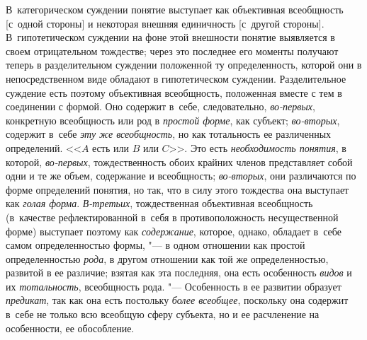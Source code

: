 В~категорическом суждении понятие выступает как объективная
всеобщность [с~одной стороны] и некоторая внешняя единичность [с~другой
стороны]. В~гипотетическом суждении на фоне этой внешности понятие
выявляется в своем отрицательном тождестве; через это последнее его моменты
получают теперь в разделительном суждении положенной ту определенность,
которой они в непосредственном виде обладают в гипотетическом суждении.
Разделительное суждение есть поэтому объективная всеобщность, положенная
вместе с тем в соединении с формой. Оно содержит в~себе, следовательно,
{\em во-первых}, конкретную всеобщность или род в {\em простой форме}, как
субъект; {\em во-вторых}, содержит в~себе {\em эту
же всеобщность}, но как тотальность ее
различенных определений. <<$A$ есть или $B$ или $C$>>. Это есть
{\em необходимость понятия}, в которой, {\em во-первых},
тождественность обоих крайних членов представляет собой одни
и те же объем, содержание и всеобщность;
{\em во-вторых}, они
различаются по форме определений понятия, но так, что в силу этого
тождества она выступает как {\em голая
форма}. {\em В-третьих},
тождественная объективная всеобщность (в~качестве
рефлектированной в~себя в противоположность несущественной форме) выступает
поэтому как {\em содержание},
которое, однако, обладает в~себе самом определенностью
формы, "--- в одном отношении как простой определенностью
{\em рода}, в другом
отношении как той же определенностью, развитой в ее различие; взятая как
эта последняя, она есть особенность {\em видов} и их {\em тотальность},
всеобщность рода. "--- Особенность в ее развитии
образует {\em предикат}, так как она есть постольку {\em более всеобщее},
поскольку она содержит в~себе не только всю всеобщую сферу
субъекта, но и ее расчленение на особенности, ее обособление.

